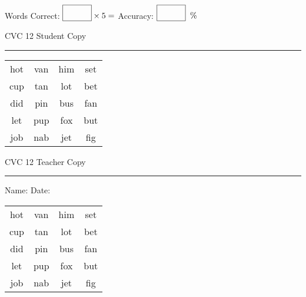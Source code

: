 \documentclass{memoir}
\begin{document}
\normalsize

Words Correct: $\fbox{\phantom{\huge 100}} \times 5 = $ Accuracy: $\fbox{\phantom{\huge 100}}\;\; \%$ 

\vfill

\newpage


\footnotesize \noindent
CVC 12 \hfill Student Copy
\smallskip
\hrule

\huge

\setlength{\tabcolsep}{14pt}
\def\arraystretch{2}

{\selectfont


\begin{vplace}[0.5]
\begin{center}
\begin{tabular}{cccc}
hot & van & him & set \\
cup & tan & lot & bet \\
did & pin & bus & fan \\
let & pup & fox & but \\
job & nab & jet & fig \\
\end{tabular}
\end{center}
\end{vplace}

}

\newpage

\footnotesize \noindent
CVC 12 \hfill Teacher Copy
\smallskip
\hrule

\normalsize

\vfill

\noindent
Name: \underline{\hspace{1.75in}} \hfill Date: \underline{\hspace{1in}}

\huge

{\selectfont


\begin{vplace}[0.5]
\begin{center}
\begin{tabular}{cccc}
hot & van & him & set \\
cup & tan & lot & bet \\
did & pin & bus & fan \\
let & pup & fox & but \\
job & nab & jet & fig \\
\end{tabular}
\end{center}
\end{vplace}



}
\end{document}
